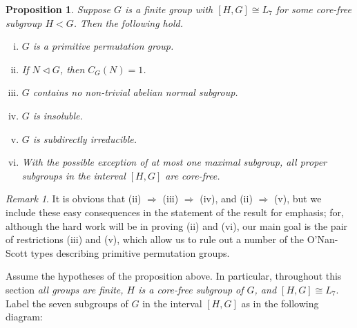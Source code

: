 \documentclass[11pt]{amsart}
\theoremstyle{plain}
\newtheorem{prop}[theorem]{Proposition}
\theoremstyle{definition}
\theoremstyle{remark}
\newtheorem*{remark}{Remark}
\numberwithin{theorem}{section}
\numberwithin{claim}{section}
\numberwithin{equation}{section}
\numberwithin{conjecture}{section}
\newcommand{\<}{\ensuremath{\langle}}
\renewcommand{\>}{\ensuremath{\rangle}}
\newcommand{\ssubnormal}{\ensuremath{\vartriangleleft}}
\newcommand{\0}{\ensuremath{\mathbf{0}}}
\newcommand{\1}{\ensuremath{\mathbf{1}}}
\newcommand{\2}{\ensuremath{\mathbf{2}}}
\newcommand{\3}{\ensuremath{\mathbf{3}}}
\newcommand{\4}{\ensuremath{\mathbf{4}}}
\newcommand{\5}{\ensuremath{\mathbf{5}}}
\begin{document}
\begin{prop}
\label{thm:except-seven-elem}
Suppose $G$ is a finite group with $[H,G]\cong L_7$ for some core-free subgroup $H<G$.  Then the following hold.
\begin{enumerate}[(i)]
\item $G$ is a primitive permutation group.
\item If $N\ssubnormal G$, then $C_G(N) = 1$.
\item $G$ contains no non-trivial abelian normal subgroup.
\item $G$ is insoluble.
\item $G$ is subdirectly irreducible.
\item With the possible exception of at most one maximal subgroup,
  all proper subgroups in the interval $[H,G]$ are core-free. 

\end{enumerate}
\end{prop}
\begin{remark}
  It is obvious that (ii) $\Rightarrow$ (iii) $\Rightarrow$ (iv), and  (ii) $\Rightarrow$
  (v), but we include these easy consequences in the statement of the result for
  emphasis; for, although the hard work will be in proving (ii) and (vi), our
  main goal is the pair of restrictions (iii) and (v), which allow us to rule
  out a number of the O'Nan-Scott types describing primitive permutation
  groups.  
\end{remark}

Assume the hypotheses of the proposition above.  In particular, throughout this
section \emph{all groups are finite, $H$ is a core-free subgroup of $G$, and $[H,G] \cong
  L_7$}. Label the seven subgroups of $G$ in
the interval $[H,G]$ as in the following diagram:

\begin{center}
  {

  }
\end{center}
\end{document}
